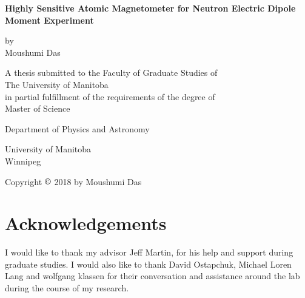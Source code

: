 \documentclass[12pt]{report}
\begin{document}
\begin{titlepage}
    \begin{center}
        \vspace*{0.5cm}
        
        {\large \textbf{Highly Sensitive Atomic Magnetometer for
            Neutron Electric Dipole Moment Experiment} }
        \vspace{0.5cm}
        {\large
        
        
        \vspace{1.5cm}
        by\\
        \vspace{0.9cm}
        Moushumi Das
        \vfill
        }
%
       \vspace{1.5cm}
       A thesis submitted to the Faculty of Graduate Studies of\\ The University of Manitoba\\
       in partial fulfillment of the requirements of the degree of\\
        \vspace{1.2cm}
        Master of Science
        {%
        \vspace{0.8cm}
        
        
        Department of Physics and Astronomy
        
        University of Manitoba\\
        Winnipeg
  }
     

  \vspace{3.0cm}
        Copyright $\copyright$ 2018 by Moushumi Das
       \end{center}  
\end{titlepage}


\section*{Acknowledgements}

I would like to thank my advisor Jeff Martin, for his help and support during graduate studies.
I would also like to thank David Ostapchuk,  Michael Loren Lang and 
wolfgang klassen for their conversation and assistance
around the lab during the course of my research.
\end{document}
